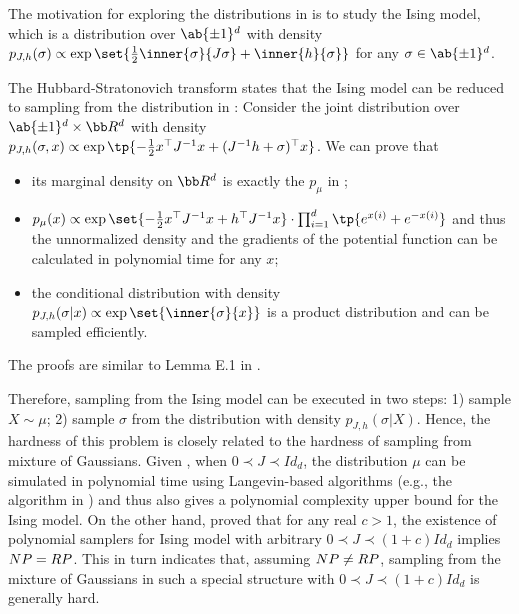 \begin{remark}
    The motivation for exploring the distributions in  is to study the Ising model, which is a distribution over $\ab\{\pm 1\}^d$ with density $p_{J,h}(\sigma)\propto \exp\set{\frac{1}{2}\inner{\sigma}{J\sigma} + \inner{h}{\sigma}}$ for any $\sigma\in \ab\{\pm 1\}^d$. 

    The Hubbard-Stratonovich transform states that the Ising model can be reduced to sampling from the distribution in : Consider the joint distribution over $\ab\{\pm 1\}^d\times \bb R^d$ with density $p_{J,h}(\sigma,x)\propto \exp\tp{-\frac{1}{2}x^\top J^{-1} x+(J^{-1}h+\sigma)^\top x}$. We can prove that
    \begin{itemize}
        \item its marginal density on $\bb R^d$ is exactly the $p_{\mu}$ in ;
        \item $p_{\mu}(x)\propto \exp\set{ - \frac{1}{2}x^{\top}J^{-1}x + h^{\top}J^{-1}x} \cdot \prod_{i=1}^d \tp{e^{x(i)}+e^{-x(i)}}$ and thus the unnormalized density and the gradients of the potential function can be calculated in polynomial time for any $x$;
        \item the conditional distribution with density $p_{J,h}(\sigma|x) \propto \exp\set{\inner{\sigma}{x}}$ is a product distribution and can be sampled efficiently.
    \end{itemize}
    The proofs are similar to Lemma E.1 in \cite{KLR22}.


    Therefore, sampling from the Ising model can be executed in two steps: 1) sample $X\sim \mu$; 2) sample $\sigma$ from the distribution with density $p_{J,h}(\sigma|X)$. Hence, the hardness of this problem is closely related to the hardness of sampling from mixture of Gaussians. Given , when $0\prec J\prec \!{Id}_d$, the distribution $\mu$ can be simulated in polynomial time using Langevin-based algorithms (e.g., the algorithm in \cite{CCBJ18}) and thus also gives a polynomial complexity upper bound for the Ising model. On the other hand, \cite{GKK24} proved that for any real $c>1$, the existence of polynomial samplers for Ising model with arbitrary $0\prec J\prec (1+c)\!{Id}_d$ implies $\*{NP}=\*{RP}$. This in turn indicates that, assuming  $\*{NP}\neq\*{RP}$, sampling from the mixture of Gaussians in such a special structure with $0\prec J\prec (1+c)\!{Id}_d$ is generally hard.
\end{remark}





